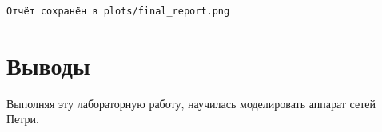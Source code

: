 \documentclass[
  12pt,
  a4paper,
  DIV=11,
  numbers=noendperiod]{scrreprt}
\begin{document}
\begin{verbatim}
Отчёт сохранён в plots/final_report.png
\end{verbatim}

\chapter{Выводы}\label{ux432ux44bux432ux43eux434ux44b}

Выполняя эту лабораторную работу, научилась моделировать аппарат сетей
Петри.


\printbibliography
\end{document}
